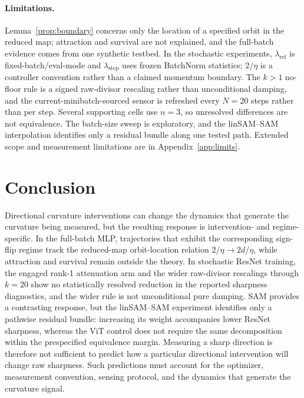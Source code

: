 \documentclass{article}
\theoremstyle{plain}
\theoremstyle{definition}
\theoremstyle{remark}
\newcommand{\lref}{\ensuremath{\lambda_{\mathrm{ref}}}}
\newcommand{\lstep}{\ensuremath{\lambda_{\mathrm{step}}}}
\begin{document}
\label{sec:predictors}

\paragraph{Limitations.} Lemma~\ref{prop:boundary} concerns only the
location of a specified orbit in the reduced map; attraction and
survival are not explained, and the full-batch evidence comes from
one synthetic testbed. In the stochastic experiments, $\lref$ is
fixed-batch/eval-mode and $\lstep$ uses frozen BatchNorm statistics;
$2/\eta$ is a controller convention rather than a claimed momentum
boundary. The $k{>}1$ no-floor rule is a signed raw-divisor rescaling
rather than unconditional damping, and the
current-minibatch-sourced sensor is refreshed every $N{=}20$ steps
rather than per step. Several supporting cells use $n{=}3$, so
unresolved differences are not equivalence. The batch-size sweep is
exploratory, and the linSAM--SAM interpolation identifies only a
residual bundle along one tested path. Extended scope and measurement
limitations are in Appendix~\ref{app:limits}.

\section{Conclusion}
Directional curvature interventions can change the dynamics that
generate the curvature being measured, but the resulting response is
intervention- and regime-specific. In the full-batch MLP,
trajectories that exhibit the corresponding sign-flip regime track
the reduced-map orbit-location relation $2/\eta\to2d/\eta$, while
attraction and survival remain outside
the theory. In stochastic ResNet training, the engaged rank-1
attenuation arm and the wider raw-divisor rescalings through $k{=}20$
show no statistically resolved reduction in the reported sharpness
diagnostics, and the wider rule is not unconditional pure damping. SAM provides a contrasting response, but
the linSAM--SAM experiment identifies only a pathwise residual
bundle: increasing its weight accompanies lower ResNet sharpness,
whereas the ViT control does not require the same decomposition
within the prespecified equivalence margin. Measuring a sharp
direction is therefore not sufficient to predict how a particular
directional intervention will change raw sharpness. Such predictions
must account for the optimizer, measurement convention, sensing
protocol, and the dynamics that generate the curvature
signal.
\end{document}
